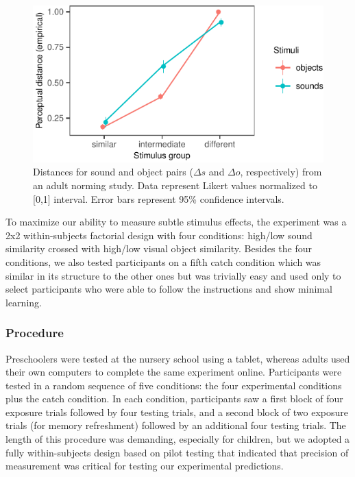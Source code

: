 \documentclass[english,,man]{apa6}
\begin{document}
\begin{figure}[h]

{\centering \includegraphics{ms_blind_files/figure-latex/stim-1} 

}

\caption{Distances for sound and object pairs ($\Delta s$ and $\Delta o$, respectively) from an adult norming study. Data represent Likert values normalized to [0,1] interval. Error bars represent 95\% confidence intervals.}\label{fig:stim}
\end{figure}

To maximize our ability to measure subtle stimulus effects, the experiment was a 2x2 within-subjects factorial design with four conditions: high/low sound similarity crossed with high/low visual object similarity. Besides the four conditions, we also tested participants on a fifth catch condition which was similar in its structure to the other ones but was trivially easy and used only to select participants who were able to follow the instructions and show minimal learning.

\hypertarget{procedure}{%
\subsubsection{Procedure}\label{procedure}}

Preschoolers were tested at the nursery school using a tablet, whereas adults used their own computers to complete the same experiment online. Participants were tested in a random sequence of five conditions: the four experimental conditions plus the catch condition. In each condition, participants saw a first block of four exposure trials followed by four testing trials, and a second block of two exposure trials (for memory refreshment) followed by an additional four testing trials. The length of this procedure was demanding, especially for children, but we adopted a fully within-subjects design based on pilot testing that indicated that precision of measurement was critical for testing our experimental predictions.
\end{document}
